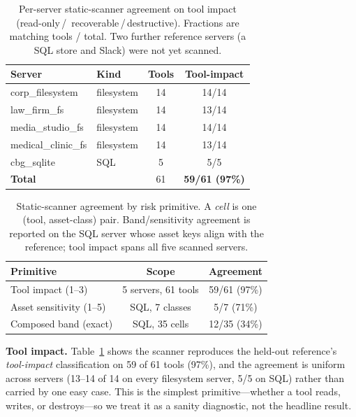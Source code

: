 \documentclass[conference]{IEEEtran}
\begin{document}
\begin{table}[t]
\centering
\caption{Per-server static-scanner agreement on tool impact (read-only\,/\,
recoverable\,/\,destructive). Fractions are matching tools / total. Two further
reference servers (a SQL store and Slack) were not yet scanned.}
\label{tab:perserver}
\small
\begin{tabular}{llcc}
\toprule
\textbf{Server} & \textbf{Kind} & \textbf{Tools} & \textbf{Tool-impact} \\
\midrule
corp\_filesystem   & filesystem & 14 & 14/14 \\
law\_firm\_fs      & filesystem & 14 & 13/14 \\
media\_studio\_fs  & filesystem & 14 & 14/14 \\
medical\_clinic\_fs& filesystem & 14 & 13/14 \\
cbg\_sqlite        & SQL        & 5  & 5/5   \\
\midrule
\textbf{Total}     &            & 61 & \textbf{59/61 (97\%)} \\
\bottomrule
\end{tabular}
\end{table}

\begin{table}[t]
\centering
\caption{Static-scanner agreement by risk primitive. A \emph{cell} is one
(tool, asset-class) pair. Band/sensitivity agreement is reported on the SQL server
whose asset keys align with the reference; tool impact spans all five scanned
servers.}
\label{tab:accuracy}
\small
\begin{tabular}{lcc}
\toprule
\textbf{Primitive} & \textbf{Scope} & \textbf{Agreement} \\
\midrule
Tool impact (1--3)        & 5 servers, 61 tools & 59/61 \;(97\%) \\
Asset sensitivity (1--5)  & SQL, 7 classes      & 5/7 \;\;(71\%) \\
Composed band (exact)     & SQL, 35 cells       & 12/35 \;(34\%) \\
\bottomrule
\end{tabular}
\end{table}

\noindent\textbf{Tool impact.}
Table~\ref{tab:perserver} shows the scanner reproduces the held-out reference's
\emph{tool-impact} classification on 59 of 61 tools (97\%), and the agreement is
uniform across servers (13--14 of 14 on every filesystem server, 5/5 on SQL)
rather than carried by one easy case. This is the simplest primitive---whether a
tool reads, writes, or destroys---so we treat it as a sanity diagnostic, not the
headline result.
\end{document}

